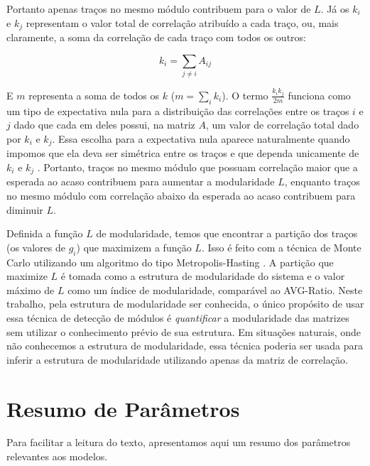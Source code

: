 Portanto apenas traços no mesmo módulo contribuem para o valor de $L$.
Já os $k_i$ e $k_j$  representam o valor total de correlação atribuído a
cada traço, ou, mais claramente, a soma da correlação de cada traço com
todos os outros:

\begin{equation}
   k_i = \sum_{j \neq i} A_{ij}
\end{equation}

E $m$ representa a soma de todos os $k$ ($m=\sum_i k_i$). 
O termo $\frac{k_ik_j}{2m}$ funciona como um tipo de expectativa nula
para a distribuição das correlações entre os traços $i$ e $j$ dado que
cada em deles possui, na matriz $A$, um valor de correlação total
dado por $k_i$ e $k_j$.
Essa escolha para a expectativa nula aparece naturalmente quando
impomos que ela deva ser simétrica entre os traços e que dependa
unicamente de $k_i$ e $k_j$ \citep[Para detalhes veja][]{Newman2006a}.
Portanto, traços no mesmo módulo que possuam correlação maior que a
esperada ao acaso contribuem para aumentar a modularidade $L$, enquanto
traços no mesmo módulo com correlação abaixo da esperada ao acaso
contribuem para diminuir $L$.

Definida a função $L$ de modularidade, temos que encontrar a partição
dos traços (os valores de $g_i$) que maximizem a função $L$. 
Isso é feito com a técnica de Monte Carlo utilizando um algoritmo
do tipo Metropolis-Hasting \citep{Metropolis1953}.
A partição que maximize $L$ é tomada como a estrutura de modularidade do
sistema e o valor máximo de $L$ como um índice de modularidade,
comparável ao AVG-Ratio. 
Neste trabalho, pela estrutura de modularidade ser conhecida, o único propósito 
de usar essa técnica de detecção de módulos é {\it quantificar} a 
modularidade das matrizes sem utilizar o conhecimento prévio de sua
estrutura. 
Em situações naturais, onde não conhecemos a estrutura de modularidade,
essa técnica poderia ser usada para inferir a estrutura de modularidade
utilizando apenas da matriz de correlação. 

\newpage
\section{Resumo de Parâmetros}

Para facilitar a leitura do texto, apresentamos aqui um resumo dos
parâmetros relevantes aos modelos.


